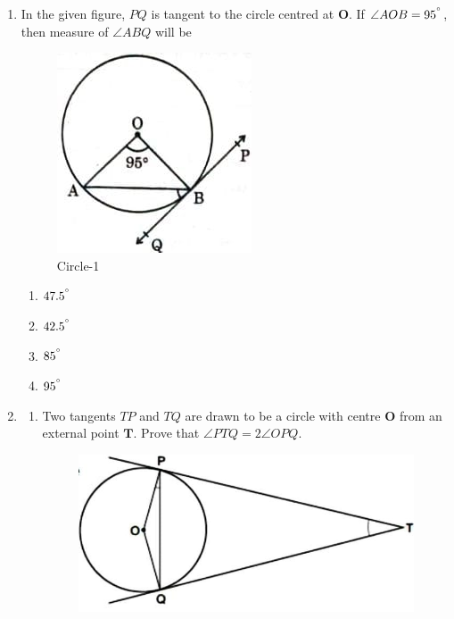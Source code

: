 \documentclass{article}
\let\vec\mathbf
\begin{document}
\begin{enumerate}
	\item In the given figure, $ PQ $ is tangent to the circle centred at $ \vec{O} $. If $ \angle{AOB} = 95^{\degree} $, then measure of $ \angle{ABQ} $ will be
	\begin{figure}[H]
		\centering
		\includegraphics[width=\columnwidth]{fig1.jpg}
		\caption{Circle-1}
		\label{fig:circle}
	\end{figure}
		\begin{enumerate}
			\item $ 47.5^{\degree} $
			\item $ 42.5^{\degree} $
			\item $ 85^{\degree} $
			\item $ 95^{\degree} $
		\end{enumerate}
	\item
		\begin{enumerate}
			\item Two tangents $ TP $ and $ TQ $ are drawn to be a circle with centre $ \vec{O} $ from an external point $ \vec{T} $. Prove that $ \angle{PTQ} = 2\angle{OPQ} $.
		\begin{figure}[H]
			\centering
			\includegraphics[width=\columnwidth]{fig2.jpg}

\end{figure}
\end{enumerate}
\end{enumerate}
\end{document}
